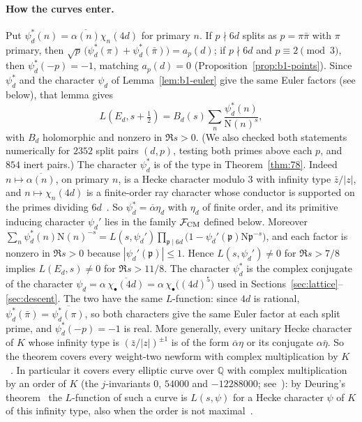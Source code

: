 \documentclass[11pt]{article}
\numberwithin{equation}{section}
\newcommand{\N}{\mathrm N}
\begin{document}
\paragraph{How the curves enter.} Put $\psi_d^*(n)=\overline{\alpha(n)}\chi_n(4d)$ for primary $n$.
If $p\nmid6d$ splits as $p=\pi\bar\pi$ with $\pi$ primary, then
$\sqrt p\,\bigl(\psi_d^*(\pi)+\psi_d^*(\bar\pi)\bigr)=a_p(d)$; if $p\nmid6d$ and $p\equiv2\pmod3$,
then $\psi_d^*(-p)=-1$, matching $a_p(d)=0$ (Proposition~\ref{prop:b1-points}). Since $\psi_d^*$ and the
character $\psi_d$ of Lemma~\ref{lem:b1-euler} give the same Euler factors (see below), that lemma gives
\begin{equation}\label{eq:d073}
 L(E_d,s+\tfrac12)=B_d(s)\sum_n\frac{\psi_d^*(n)}{\N(n)^s},
\end{equation}
with $B_d$ holomorphic and nonzero in $\Re s>0$. (We also checked both statements numerically for
$2352$ split pairs $(d,p)$, testing both primes above each $p$, and $854$ inert pairs.)
The character $\psi_d^*$ is of the type in Theorem~\ref{thm:78}. Indeed $n\mapsto\overline{\alpha(n)}$, on primary
$n$, is a Hecke character modulo $3$ with infinity type $\bar z/|z|$, and $n\mapsto\chi_n(4d)$ is a finite-order
ray character whose conductor is supported on the primes dividing $6d$~\cite[Lemma~4.1]{OAI78}.
So $\psi_d^*=\overline\alpha\eta_d$ with $\eta_d$ of finite order, and its primitive inducing character $\psi_d'$
lies in the family $\mathcal F_{\rm CM}$ defined below. Moreover
$\sum_n\psi_d^*(n)\N(n)^{-s}=L(s,\psi_d')\prod_{\mathfrak p\mid6d}\bigl(1-\psi_d'(\mathfrak p)\N\mathfrak p^{-s}\bigr)$,
and each factor is nonzero in $\Re s>0$ because $|\psi_d'(\mathfrak p)|\le1$. Hence $L(s,\psi_d')\ne0$ for
$\Re s>7/8$ implies $L(E_d,s)\ne0$ for $\Re s>11/8$.
The character $\psi_d^*$ is the complex conjugate of the character
$\psi_d=\alpha\,\overline{\chi_\bullet(4d)}=\alpha\,\chi_\bullet\bigl((4d)^5\bigr)$ used in
Sections~\ref{sec:lattice}--\ref{sec:descent}. The two have the same
$L$-function: since $4d$ is rational, $\psi_d^*(\bar\pi)=\overline{\psi_d^*(\pi)}$, so both
characters give the same Euler factor at each split prime, and $\psi_d^*(-p)=-1$ is real.
More generally, every unitary Hecke character of $K$ whose infinity type is
$(\bar z/|z|)^{\pm1}$ is of the form $\overline\alpha\eta$ or its conjugate
$\alpha\bar\eta$. So the theorem covers every weight-two newform with complex
multiplication by $K$~\cite{Ribet77}. In particular it covers every elliptic curve over
$\mathbb Q$ with complex multiplication by an order of $K$ (the $j$-invariants
$0$, $54000$ and $-12288000$; see~\cite{Cox89}): by Deuring's theorem~\cite{Deuring} the $L$-function of such a curve is $L(s,\psi)$ for a Hecke
character $\psi$ of $K$ of this infinity type, also when the order is not maximal~\cite[Chapter~II, \S10, and
Appendix~A, \S3]{SilATAEC}.
\end{document}
